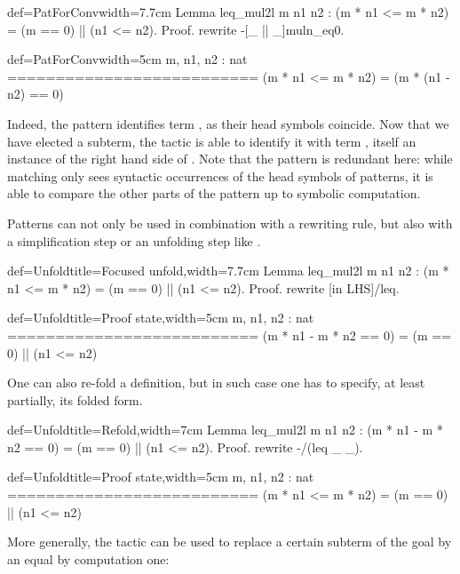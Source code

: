 \begin{coq}{def=PatForConv}{width=7.7cm}
Lemma leq_mul2l m n1 n2 :
(m * n1 <= m * n2) = (m == 0) || (n1 <= n2).
Proof.
rewrite -[_ || _]muln_eq0.
\end{coq}
\begin{coqout}{def=PatForConv}{width=5cm}
m, n1, n2 : nat
==========================
(m * n1 <= m * n2) =
  (m * (n1 - n2) == 0)
\end{coqout}

Indeed, the \C{[_ || _]} pattern identifies term , as
their head symbols coincide. Now that we have elected a subterm, the
 tactic is able to identify it with term
, itself an instance of the right hand side
of . Note that the \C{[_ || _]} pattern is redundant here:
while matching only sees syntactic occurrences of the
head symbols of patterns, it is able to compare the other parts of the
pattern up to symbolic computation.

Patterns can not only be used in combination with a rewriting rule,
but also with a simplification step \C{/=} or an unfolding step
like .

\begin{coq}{def=Unfold}{title=Focused unfold,width=7.7cm}
Lemma leq_mul2l m n1 n2 :
(m * n1 <= m * n2) = (m == 0) || (n1 <= n2).
Proof.
rewrite [in LHS]/leq.
\end{coq}
\begin{coqout}{def=Unfold}{title=Proof state,width=5cm}
m, n1, n2 : nat
==========================
(m * n1 - m * n2 == 0) =
  (m == 0) || (n1 <= n2)
\end{coqout}

One can also re-fold a definition, but in such case one has to specify,
at least partially, its folded form.

\begin{coq}{def=Unfold}{title=Refold,width=7cm}
Lemma leq_mul2l m n1 n2 :
  (m * n1 - m * n2 == 0) =
    (m == 0) || (n1 <= n2).
Proof.
rewrite -/(leq _ _).
\end{coq}
\begin{coqout}{def=Unfold}{title=Proof state,width=5cm}
m, n1, n2 : nat
==========================
(m * n1 <= m * n2) =
  (m == 0) || (n1 <= n2)
\end{coqout}

More generally, the  tactic can be used to replace a
certain subterm of the goal by an equal by computation one:

